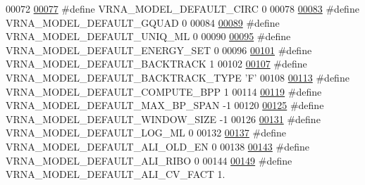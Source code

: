 \begin{DoxyCode}
00072 
\mbox{\hyperlink{group__model__details_ga22059033db7bcd875c51fec32425490a}{00077}} \textcolor{preprocessor}{#define VRNA\_MODEL\_DEFAULT\_CIRC           0}
00078 
\mbox{\hyperlink{group__model__details_ga793ed812e86f43799b14b2deee917f23}{00083}} \textcolor{preprocessor}{#define VRNA\_MODEL\_DEFAULT\_GQUAD          0}
00084 
\mbox{\hyperlink{group__model__details_ga63f6006a02ba2d89148441f406c309e7}{00089}} \textcolor{preprocessor}{#define VRNA\_MODEL\_DEFAULT\_UNIQ\_ML        0}
00090 
\mbox{\hyperlink{group__model__details_ga6fcf6b2d0f89256cdbd166486c9b6e1e}{00095}} \textcolor{preprocessor}{#define VRNA\_MODEL\_DEFAULT\_ENERGY\_SET     0}
00096 
\mbox{\hyperlink{group__model__details_ga3fda8006ab84baf817bd8e5ccbc6bb35}{00101}} \textcolor{preprocessor}{#define VRNA\_MODEL\_DEFAULT\_BACKTRACK      1}
00102 
\mbox{\hyperlink{group__model__details_gad0e81fcaca53c4a826c68e0796de2afb}{00107}} \textcolor{preprocessor}{#define VRNA\_MODEL\_DEFAULT\_BACKTRACK\_TYPE 'F'}
00108 
\mbox{\hyperlink{group__model__details_ga1d6cd5051940b126c248147c011bac6c}{00113}} \textcolor{preprocessor}{#define VRNA\_MODEL\_DEFAULT\_COMPUTE\_BPP    1}
00114 
\mbox{\hyperlink{group__model__details_ga7cb6f4ae8fdebff6746a4410814f2977}{00119}} \textcolor{preprocessor}{#define VRNA\_MODEL\_DEFAULT\_MAX\_BP\_SPAN    -1}
00120 
\mbox{\hyperlink{group__model__details_ga8de04a9cb57e811e313b0f9f207f6bdb}{00125}} \textcolor{preprocessor}{#define VRNA\_MODEL\_DEFAULT\_WINDOW\_SIZE    -1}
00126 
\mbox{\hyperlink{group__model__details_ga938f68463e84fe060aa6502f428a517d}{00131}} \textcolor{preprocessor}{#define VRNA\_MODEL\_DEFAULT\_LOG\_ML         0}
00132 
\mbox{\hyperlink{group__model__details_ga2a5bbfc1edf33077e39466d2d9807115}{00137}} \textcolor{preprocessor}{#define VRNA\_MODEL\_DEFAULT\_ALI\_OLD\_EN     0}
00138 
\mbox{\hyperlink{group__model__details_ga64b3ab65a9ca42d4ad1d05e193083147}{00143}} \textcolor{preprocessor}{#define VRNA\_MODEL\_DEFAULT\_ALI\_RIBO       0}
00144 
\mbox{\hyperlink{group__model__details_gaaaf3d73d6abc18d3889676952bfedb96}{00149}} \textcolor{preprocessor}{#define VRNA\_MODEL\_DEFAULT\_ALI\_CV\_FACT    1.}

\end{DoxyCode}
